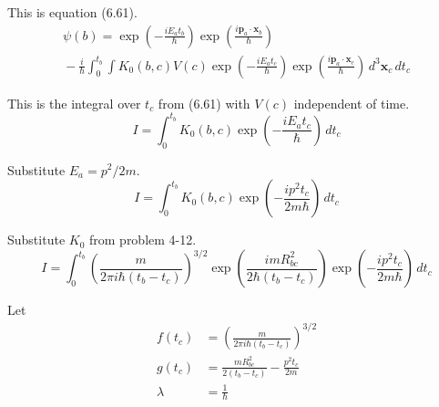 


\bigskip
This is equation (6.61).
\begin{multline*}
\psi(b)=
\exp\left(-\frac{iE_at_b}{\hbar}\right)
\exp\left(\frac{i\mathbf p_a\cdot\mathbf x_b}{\hbar}\right)
\\
{}-\frac{i}{\hbar}\int_0^{t_b}\int
K_0(b,c)V(c)
\exp\left(-\frac{iE_at_c}{\hbar}\right)
\exp\left(\frac{i\mathbf p_a\cdot\mathbf x_c}{\hbar}\right)
\,d^3\mathbf x_c\,dt_c
\tag{6.61}
\end{multline*}

This is the integral over $t_c$ from (6.61) with $V(c)$ independent of time.
\begin{equation*}
I=\int_0^{t_b}K_0(b,c)
\exp\left(-\frac{iE_at_c}{\hbar}\right)
\,dt_c
\end{equation*}

Substitute $E_a=p^2/2m$.
\begin{equation*}
I=\int_0^{t_b}K_0(b,c)
\exp\left(-\frac{ip^2t_c}{2m\hbar}\right)
\,dt_c
\end{equation*}

Substitute $K_0$ from problem 4-12.
\begin{equation*}
I=\int_0^{t_b}
\left(\frac{m}{2\pi i\hbar(t_b-t_c)}\right)^{3/2}
\exp\left(\frac{imR_{bc}^2}{2\hbar(t_b-t_c)}\right)
\exp\left(-\frac{ip^2t_c}{2m\hbar}\right)
\,dt_c
\end{equation*}

Let
\begin{align*}
f(t_c)&=\left(\frac{m}{2\pi i\hbar(t_b-t_c)}\right)^{3/2}
\\
g(t_c)&=\frac{m R_{bc}^2}{2(t_b-t_c)}-\frac{p^2t_c}{2m}
\\
\lambda&=\frac{1}{\hbar}
\end{align*}


